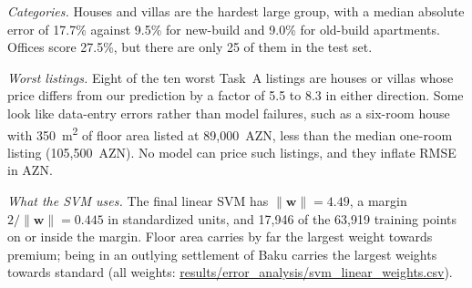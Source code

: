 \documentclass[10pt,twocolumn,a4paper]{article}
\begin{document}
\textit{Categories.} Houses and villas are the hardest large group, with
a median absolute error of 17.7\% %
against 9.5\% for new-build %
and 9.0\% for old-build apartments. %
Offices score 27.5\%, %
but there are only 25 of them in the test set. %

\textit{Worst listings.} Eight of the ten worst Task~A listings are houses %
or villas whose price differs from our prediction by a factor of 5.5 %
to 8.3 in either direction. Some look like data-entry errors rather than model failures,
such as a six-room house with 350~m\textsuperscript{2} of floor area listed at %
89{,}000~AZN, %
less than the median one-room listing (105{,}500~AZN). %
No model can price such listings, and they inflate RMSE in AZN.

\textit{What the SVM uses.} The final linear SVM has
$\lVert\mathbf{w}\rVert = 4.49$, %
a margin $2/\lVert\mathbf{w}\rVert = 0.445$ in standardized units, %
and 17{,}946 of the 63{,}919 training points on or inside the margin. %
Floor area carries by far the largest weight towards premium; being in
an outlying settlement of Baku carries the largest weights towards
standard (all weights: \url{results/error_analysis/svm_linear_weights.csv}). %

\end{document}
